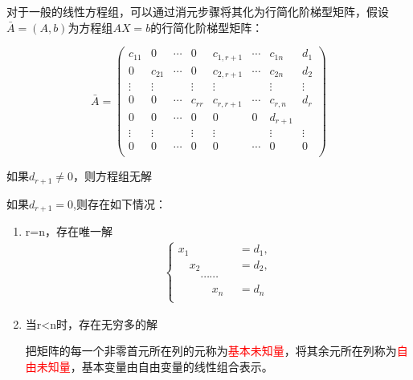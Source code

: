 \begin{note}

    \begin{center}
    \end{center}

    对于一般的线性方程组，可以通过消元步骤将其化为行简化阶梯型矩阵，假设$\bar A=(A,b)$为方程组$AX=b$的行简化阶梯型矩阵：

\begin{equation*}
        \bar A=\begin{pmatrix}
            c_{11}&0&\cdots&0&c_{1,r+1}&\cdots&c_{1n}&d_1\\
            0&c_{21}&\cdots&0&c_{2,r+1}&\cdots&c_{2n}&d_2\\
            \vdots&\vdots&\ &\vdots&\vdots&\ &\vdots&\vdots\\
            0&0&\cdots&c_{rr}&c_{r,r+1}&\cdots&c_{r,n}&d_{r}\\
            0&0&\cdots&0&0&0&d_{r+1}\\
            \vdots&\vdots&\ &\vdots&\vdots&\ &\vdots&\vdots\\
            0&0&\cdots&0&0&\cdots&0&0\\
        \end{pmatrix}
\end{equation*}

如果$d_{r+1}\neq 0$，则方程组无解

如果$d_{r+1}=0$,则存在如下情况：

\begin{enumerate}
    \item r=n，存在唯一解
    $$
    \begin{aligned}
        \begin{cases}
            x_1\quad \quad \quad &=d_1,\\
            \quad x_2\quad \quad &=d_2,\\
            \quad \quad \cdots\cdots\quad &\\
            \quad\quad \quad  x_n&=d_n\\
        \end{cases}
    \end{aligned}
    $$

    \item 当r<n时，存在无穷多的解

    把矩阵的每一个非零首元所在列的元称为\textcolor{red}{基本未知量}，将其余元所在列称为\textcolor{red}{自由未知量}，基本变量由自由变量的线性组合表示。
\end{enumerate}
\end{note}

